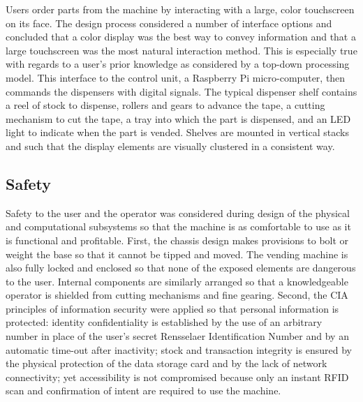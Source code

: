 \documentclass[12pt,draft,oneside]{article}
\begin{document}
Users order parts from the machine by interacting with a large, color touchscreen on its face. The design process considered a number of interface options and concluded that a color display was the best way to convey information and that a large touchscreen was the most natural interaction method. This is especially true with regards to a user's prior knowledge as considered by a top-down processing model. This interface to the control unit, a Raspberry Pi micro-computer, then commands the dispensers with digital signals. The typical dispenser shelf contains a reel of stock to dispense, rollers and gears to advance the tape, a cutting mechanism to cut the tape, a tray into which the part is dispensed, and an LED light to indicate when the part is vended. Shelves are mounted in vertical stacks and such that the display elements are visually clustered in a consistent way.

\subsection{Safety}
Safety to the user and the operator was considered during design of the physical and computational subsystems so that the machine is as comfortable to use as it is functional and profitable. First, the chassis design makes provisions to bolt or weight the base so that it cannot be tipped and moved. The vending machine is also fully locked and enclosed so that none of the exposed elements are dangerous to the user. Internal components are similarly arranged so that a knowledgeable operator is shielded from cutting mechanisms and fine gearing. Second, the CIA principles of information security were applied so that personal information is protected: identity confidentiality is established by the use of an arbitrary number in place of the user's secret Rensselaer Identification Number and by an automatic time-out after inactivity; stock and transaction integrity is ensured by the physical protection of the data storage card and by the lack of network connectivity; yet accessibility is not compromised because only an instant RFID scan and confirmation of intent are required to use the machine.
\end{document}
